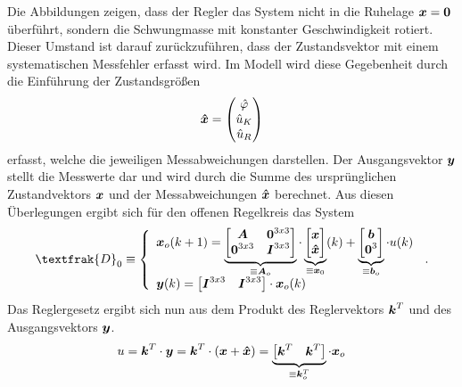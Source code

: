 \newpage
Die Abbildungen zeigen, dass der Regler das System nicht in die Ruhelage $\boldsymbol{x}=\boldsymbol{0}$ überführt, sondern die Schwungmasse mit konstanter Geschwindigkeit rotiert. Dieser Umstand ist darauf zurückzuführen, dass der Zustandsvektor mit einem systematischen Messfehler erfasst wird. Im Modell wird diese Gegebenheit durch die Einführung der Zustandsgrößen
\begin{equation}
\boldsymbol{\hat{x}} = \begin{pmatrix}
\hat{\varphi} \\ \hat{u}_K \\ \hat{u}_R
\end{pmatrix}
\end{equation}
erfasst, welche die jeweiligen Messabweichungen darstellen. Der Ausgangsvektor $\boldsymbol{y}$ stellt die Messwerte dar und wird durch die Summe des ursprünglichen Zustandvektors $\boldsymbol{x}$ und der Messabweichungen $\boldsymbol{\hat{x}}$ berechnet. Aus diesen Überlegungen ergibt sich für den offenen Regelkreis das System
\begin{equation}
\textfrak{D}_0 \equiv \left\{ \begin{array}{ll}
\bs{x}_o(k+1) = \underbrace{\begin{bmatrix}
\bs{A} & \bs{0}^{3x3} \\ \bs{0}^{3x3} & \bs{I}^{3x3}\end{bmatrix}}_{\equiv \bs{A}_o}\cdot \underbrace{\begin{bmatrix}
\bs{x} \\ \bs{\hat{x}}
\end{bmatrix}}_{\equiv \bs{x}_0}(k) + \underbrace{\begin{bmatrix}
\bs{b} \\ \bs{0}^3 \end{bmatrix}}_{\equiv \bs{b}_o} \cdot u(k)
\\
\bs{y}(k) = \begin{bmatrix}
\bs{I}^{3x3} & \bs{I}^{3x3}\end{bmatrix}\cdot \bs{x}_o(k)
\end{array}
\right. \,.
\end{equation}
Das Reglergesetz ergibt sich nun aus dem Produkt des Reglervektors $\boldsymbol{k}^T$ und des Ausgangsvektors $\boldsymbol{y}$.
\begin{equation}
u = \boldsymbol{k}^T\cdot \boldsymbol{y} = \boldsymbol{k}^T \cdot (\boldsymbol{x} + \boldsymbol{\hat{x}}) = \underbrace{\begin{bmatrix}
\boldsymbol{k}^T & \boldsymbol{k}^T
\end{bmatrix}}_{\equiv \boldsymbol{k}^T_o} \cdot \boldsymbol{x}_o
\end{equation}
